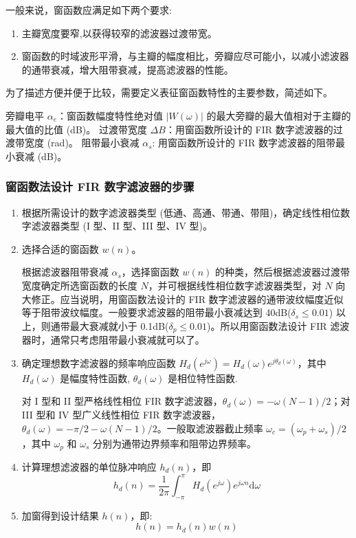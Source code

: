 \documentclass[12pt,AutoFakeBold]{article}
\begin{document}
一般来说，窗函数应满足如下两个要求:
\begin{enumerate}[(1)]
\item 主瓣宽度要窄,以获得较窄的滤波器过渡带宽。
\item 窗函数的时域波形平滑，与主瓣的幅度相比，旁瓣应尽可能小，以减小滤波器的通带衰减，增大阻带衰减，提高滤波器的性能。
\end{enumerate}

为了描述方便并便于比较，需要定义表征窗函数特性的主要参数，简述如下。

旁瓣电平 $\alpha_e$：窗函数幅度特性绝对值 $|W(\omega)|$ 的最大旁瓣的最大值相对于主瓣的最大值的比值 (dB)。
过渡带宽度 $\Delta B$：用窗函数所设计的 FIR 数字滤波器的过渡带宽度 (rad)。
阻带最小衰减 $\alpha_s$: 用窗函数所设计的 FIR 数字滤波器的阻带最小衰减 (dB)。

\subsubsection{窗函数法设计 FIR 数字滤波器的步骤}

\begin{enumerate}[(1)]
\item 根据所需设计的数字滤波器类型 (低通、高通、带通、带阻)，确定线性相位数字滤波器类型 (I 型、II 型、III 型、IV 型)。
\item 选择合适的窗函数 $w(n)$。

根据滤波器阻带衰减 $\alpha_s$，选择窗函数 $w(n)$ 的种类，然后根据滤波器过渡带宽度确定所选窗函数的长度 $N$，并可根据线性相位数字滤波器类型，对 $N$ 向大修正。应当说明，用窗函数法设计的 FIR 数字滤波器的通带波纹幅度近似等于阻带波纹幅度。一般要求滤波器的阻带最小衰减达到 40dB($\delta_s\le0.01$) 以上，则通带最大衰减就小于 0.1dB($\delta_p\le0.01$)。所以用窗函数法设计 FIR 滤波器时，通常只考虑阻带最小衰减就可以了。
\item 确定理想数字滤波器的频率响应函数 $H_d(e^{j\omega})=H_d(\omega)e^{j\theta_d(\omega)}$，其中 $H_d(\omega)$ 是幅度特性函数, $\theta_d(\omega)$ 是相位特性函数.

对 I 型和 II 型严格线性相位 FIR 数字滤波器，$θ_d(\omega)=-\omega(N-1)/2$；对 III 型和 IV 型广义线性相位 FIR 数字滤波器，$θ_d(\omega)=-\pi/2-\omega(N-1)/2$。一般取滤波器截止频率 $\omega_c=(\omega_p+\omega_s)/2$，其中 $\omega_p$ 和 $\omega_s$ 分别为通带边界频率和阻带边界频率。
\item 计算理想滤波器的单位脉冲响应 $h_d(n)$，即
%
\begin{equation}
h_d(n)=\frac{1}{2\pi}\int_{-\pi}^{\pi}H_d(e^{j\omega})e^{j\omega n}\mathrm{d}\omega
\end{equation}
%
\item 加窗得到设计结果 $h(n)$，即:
%
\begin{equation}
h(n)=h_d(n)w(n)
\end{equation}
%
\end{enumerate}
\end{document}
